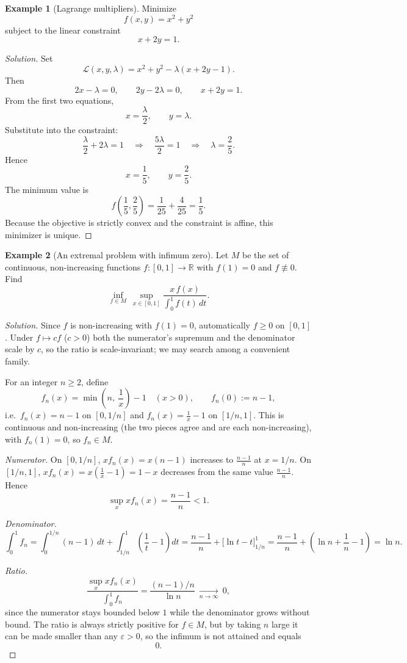 \documentclass[11pt]{article}
\theoremstyle{definition}
\newtheorem{example}{Example}[section]
\newcommand{\R}{\mathbb{R}}
\begin{document}
\begin{example}[Lagrange multipliers]
Minimize
\[
f(x,y)=x^2+y^2
\]
subject to the linear constraint
\[
x+2y=1.
\]
\end{example}

\begin{proof}[Solution]
Set
\[
\mathcal{L}(x,y,\lambda)=x^2+y^2-\lambda(x+2y-1).
\]
Then
\[
2x-\lambda=0, \qquad 2y-2\lambda=0, \qquad x+2y=1.
\]
From the first two equations,
\[
x=\frac{\lambda}{2}, \qquad y=\lambda.
\]
Substitute into the constraint:
\[
\frac{\lambda}{2}+2\lambda=1 \quad \Longrightarrow \quad \frac{5\lambda}{2}=1 \quad \Longrightarrow \quad \lambda=\frac{2}{5}.
\]
Hence
\[
x=\frac{1}{5}, \qquad y=\frac{2}{5}.
\]
The minimum value is
\[
f\left(\frac15,\frac25\right)=\frac{1}{25}+\frac{4}{25}=\frac15.
\]
Because the objective is strictly convex and the constraint is affine, this minimizer is unique.
\end{proof}

\begin{example}[An extremal problem with infimum zero]
Let $M$ be the set of continuous, non-increasing functions $f:[0,1]\to\R$ with $f(1)=0$ and $f\not\equiv0$. Find
\[
\inf_{f\in M}\ \sup_{x\in[0,1]}\frac{x\,f(x)}{\int_0^1 f(t)\,dt}.
\]
\end{example}

\begin{proof}[Solution]
Since $f$ is non-increasing with $f(1)=0$, automatically $f\ge0$ on $[0,1]$. Under $f\mapsto cf$ ($c>0$) both the numerator's supremum and the denominator scale by $c$, so the ratio is scale-invariant; we may search among a convenient family.

For an integer $n\ge2$, define
\[
f_n(x)=\min\!\left(n,\ \frac1x\right)-1 \quad (x>0), \qquad f_n(0):=n-1,
\]
i.e.\ $f_n(x)=n-1$ on $[0,1/n]$ and $f_n(x)=\frac1x-1$ on $[1/n,1]$. This is continuous and non-increasing (the two pieces agree and are each non-increasing), with $f_n(1)=0$, so $f_n\in M$.

\emph{Numerator.} On $[0,1/n]$, $xf_n(x)=x(n-1)$ increases to $\frac{n-1}{n}$ at $x=1/n$. On $[1/n,1]$, $xf_n(x)=x\left(\frac1x-1\right)=1-x$ decreases from the same value $\frac{n-1}{n}$. Hence
\[
\sup_{x}xf_n(x)=\frac{n-1}{n}<1.
\]

\emph{Denominator.}
\[
\int_0^1 f_n=\int_0^{1/n}(n-1)\,dt+\int_{1/n}^1\left(\frac1t-1\right)dt=\frac{n-1}{n}+\Big[\ln t-t\Big]_{1/n}^{1}=\frac{n-1}{n}+\left(\ln n+\frac1n-1\right)=\ln n.
\]

\emph{Ratio.}
\[
\frac{\sup_x xf_n(x)}{\int_0^1f_n}=\frac{(n-1)/n}{\ln n}\ \xrightarrow[n\to\infty]{}\ 0,
\]
since the numerator stays bounded below $1$ while the denominator grows without bound. The ratio is always strictly positive for $f\in M$, but by taking $n$ large it can be made smaller than any $\varepsilon>0$, so the infimum is not attained and equals
\[
\boxed{0}.
\]
\end{proof}
\end{document}
